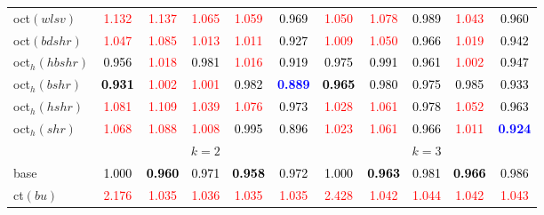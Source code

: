 \begin{tabular}[t]{l|>{}cccc>{}c|ccccc}
oct$(wlsv)$ & \textcolor{red}{1.132} & \textcolor{red}{1.137} & \textcolor{red}{1.065} & \textcolor{red}{1.059} & \textcolor{black}{0.969} & \textcolor{red}{1.050} & \textcolor{red}{1.078} & \textcolor{black}{0.989} & \textcolor{red}{1.043} & \textcolor{black}{0.960}\\
oct$(bdshr)$ & \textcolor{red}{1.047} & \textcolor{red}{1.085} & \textcolor{red}{1.013} & \textcolor{red}{1.011} & \textcolor{black}{0.927} & \textcolor{red}{1.009} & \textcolor{red}{1.050} & \textcolor{black}{0.966} & \textcolor{red}{1.019} & \textcolor{black}{0.942}\\
oct$_h(hbshr)$ & \textcolor{black}{0.956} & \textcolor{red}{1.018} & \textcolor{black}{0.981} & \textcolor{red}{1.016} & \textcolor{black}{0.919} & \textcolor{black}{0.975} & \textcolor{black}{0.991} & \textcolor{black}{0.961} & \textcolor{red}{1.002} & \textcolor{black}{0.947}\\
oct$_h(bshr)$ & \textcolor{black}{\textbf{0.931}} & \textcolor{red}{1.002} & \textcolor{red}{1.001} & \textcolor{black}{0.982} & \textcolor{blue}{\textbf{0.889}} & \textcolor{black}{\textbf{0.965}} & \textcolor{black}{0.980} & \textcolor{black}{0.975} & \textcolor{black}{0.985} & \textcolor{black}{0.933}\\
oct$_h(hshr)$ & \textcolor{red}{1.081} & \textcolor{red}{1.109} & \textcolor{red}{1.039} & \textcolor{red}{1.076} & \textcolor{black}{0.973} & \textcolor{red}{1.028} & \textcolor{red}{1.061} & \textcolor{black}{0.978} & \textcolor{red}{1.052} & \textcolor{black}{0.963}\\
oct$_h(shr)$ & \textcolor{red}{1.068} & \textcolor{red}{1.088} & \textcolor{red}{1.008} & \textcolor{black}{0.995} & \textcolor{black}{0.896} & \textcolor{red}{1.023} & \textcolor{red}{1.061} & \textcolor{black}{0.966} & \textcolor{red}{1.011} & \textcolor{blue}{\textbf{0.924}}\\
\addlinespace[0.3em]
\multicolumn{1}{c}{} & \multicolumn{5}{c}{\textbf{$k = 2$}} & \multicolumn{5}{c}{\textbf{$k = 3$}}\\
base & \textcolor{black}{1.000} & \textcolor{black}{\textbf{0.960}} & \textcolor{black}{0.971} & \textcolor{black}{\textbf{0.958}} & \textcolor{black}{0.972} & \textcolor{black}{1.000} & \textcolor{black}{\textbf{0.963}} & \textcolor{black}{0.981} & \textcolor{black}{\textbf{0.966}} & \textcolor{black}{0.986}\\
ct$(bu)$ & \textcolor{red}{2.176} & \textcolor{red}{1.035} & \textcolor{red}{1.036} & \textcolor{red}{1.035} & \textcolor{red}{1.035} & \textcolor{red}{2.428} & \textcolor{red}{1.042} & \textcolor{red}{1.044} & \textcolor{red}{1.042} & \textcolor{red}{1.043}\\

\end{tabular}
